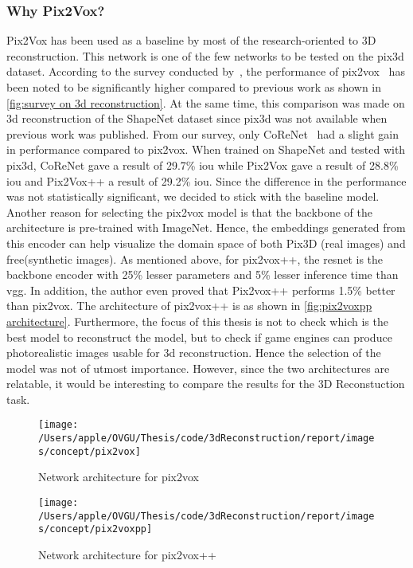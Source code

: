 \subsubsection{Why Pix2Vox?}
Pix2Vox has been used as a baseline by most of the research-oriented to 3D reconstruction.
This network is one of the few networks to be tested on the pix3d dataset.
According to the survey conducted by~\cite{Han2021ImageBased3O}, the performance of pix2vox~\cite{Xie_2019}
has been noted to be significantly higher compared to previous work  as shown in \autoref{fig:survey on 3d reconstruction}.
At the same time, this comparison was made on 3d reconstruction of the ShapeNet dataset since pix3d was not available when previous work was published.
From our survey, only CoReNet~\cite{popov2020corenet} had a slight gain in performance compared to pix2vox.
When trained on ShapeNet and tested with pix3d, CoReNet gave a result of 29.7\% \gls{iou} while Pix2Vox gave a result of 28.8\% \gls{iou}  and Pix2Vox++ a result of 29.2\% \gls{iou}\@.
Since the difference in the performance was not statistically significant, we decided to stick with the baseline model.
Another reason for selecting the pix2vox model is that the backbone of the architecture is pre-trained with ImageNet.
Hence, the embeddings generated from this encoder can help visualize the domain space of both Pix3D (real images)  and \gls{free}(synthetic images).
As mentioned above, for pix2vox++, the \gls{resnet} is the backbone encoder with 25\% lesser parameters and 5\% lesser inference time than \gls{vgg}\@.
In addition, the author even proved that Pix2vox++ performs 1.5\% better than pix2vox.
The architecture of pix2vox++ is as shown in \autoref{fig:pix2voxpp architecture}.
Furthermore, the focus of this thesis is not to check which is the best model to reconstruct the model, but to check if game engines can produce photorealistic images usable for 3d reconstruction.
Hence the selection of the model was not of utmost importance.
However, since the two architectures are relatable, it would be interesting to compare the results for the 3D Reconstuction task. \begin{figure}
    \centering
    \texttt{[image: /Users/apple/OVGU/Thesis/code/3dReconstruction/report/images/concept/pix2vox]}
    \caption{Network architecture for pix2vox~\cite{Xie_2019}}
    \label{fig:pix2vox architecture}
\end{figure}

\begin{figure}
    \centering
    \texttt{[image: /Users/apple/OVGU/Thesis/code/3dReconstruction/report/images/concept/pix2voxpp]}
    \caption{Network architecture for pix2vox++~\cite{Xie_2020}}
    \label{fig:pix2voxpp architecture}
\end{figure}

